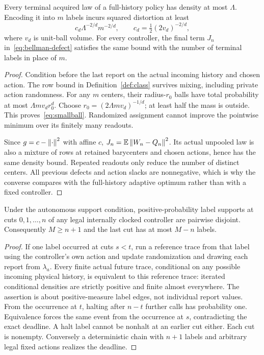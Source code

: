 \begin{lemma}\label{lem:lower}
Every terminal acquired law of a full-history policy has density at most $\Lambda$. Encoding it into $m$ labels incurs squared distortion at least
\begin{equation}\label{eq:smallball}
 c_d\Lambda^{-2/d}m^{-2/d},\qquad
 c_d=\tfrac12(2v_d)^{-2/d},
\end{equation}
where $v_d$ is unit-ball volume. For every controller, the final term $J_n$ in~\eqref{eq:bellman-defect} satisfies the same bound with the number of terminal labels in place of $m$.
\end{lemma}
\begin{proof}
Condition before the last report on the actual incoming history and chosen action. The row bound in Definition~\ref{def:class} survives mixing, including private action randomness. For any $m$ centers, their radius-$r_0$ balls have total probability at most $\Lambda mv_dr_0^d$. Choose $r_0=(2\Lambda mv_d)^{-1/d}$; at least half the mass is outside. This proves~\eqref{eq:smallball}. Randomized assignment cannot improve the pointwise minimum over its finitely many readouts.

Since $g=c-\left\lVert\cdot\right\rVert^2$ with affine $c$, $J_n=\mathbb E\left\lVert W_n-Q_n\right\rVert^2$. Its actual unpooled law is also a mixture of rows at retained barycenters and chosen actions, hence has the same density bound. Repeated readouts only reduce the number of distinct centers. All previous defects and action slacks are nonnegative, which is why the converse compares with the full-history adaptive optimum rather than with a fixed controller.
\end{proof}

\begin{lemma}\label{lem:clock}
Under the autonomous support condition, positive-probability label supports at cuts $0,1,\ldots,n$ of any legal internally clocked controller are pairwise disjoint. Consequently $M\ge n+1$ and the last cut has at most $M-n$ labels.
\end{lemma}
\begin{proof}
If one label occurred at cuts $s<t$, run a reference trace from that label using the controller's own action and update randomization and drawing each report from $\lambda_a$. Every finite actual future trace, conditional on any possible incoming physical history, is equivalent to this reference trace: iterated conditional densities are strictly positive and finite almost everywhere. The assertion is about positive-measure label edges, not individual report values. From the occurrence at $t$, halting after $n-t$ further calls has probability one. Equivalence forces the same event from the occurrence at $s$, contradicting the exact deadline. A halt label cannot be nonhalt at an earlier cut either. Each cut is nonempty. Conversely a deterministic chain with $n+1$ labels and arbitrary legal fixed actions realizes the deadline.
\end{proof}


